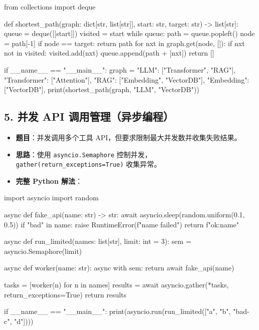 \begin{codeblock}
from collections import deque


def shortest_path(graph: dict[str, list[str]], start: str, target: str) -> list[str]:
    queue = deque([[start]])
    visited = {start}
    while queue:
        path = queue.popleft()
        node = path[-1]
        if node == target:
            return path
        for nxt in graph.get(node, []):
            if nxt not in visited:
                visited.add(nxt)
                queue.append(path + [nxt])
    return []


if __name__ == "__main__":
    graph = {
        "LLM": ["Transformer", "RAG"],
        "Transformer": ["Attention"],
        "RAG": ["Embedding", "VectorDB"],
        "Embedding": ["VectorDB"],
    }
    print(shortest_path(graph, "LLM", "VectorDB"))
\end{codeblock}

\subsection{5. 并发 API 调用管理（异步编程）}
\begin{itemize}[leftmargin=2em]
\item \textbf{题目}：并发调用多个工具 API，但要求限制最大并发数并收集失败结果。
\item \textbf{思路}：使用 \texttt{asyncio.Semaphore} 控制并发，\texttt{gather(return\_exceptions=True)} 收集异常。
\item \textbf{完整 Python 解法}：
\end{itemize}

\begin{codeblock}
import asyncio
import random


async def fake_api(name: str) -> str:
    await asyncio.sleep(random.uniform(0.1, 0.5))
    if "bad" in name:
        raise RuntimeError(f"{name} failed")
    return f"ok:{name}"


async def run_limited(names: list[str], limit: int = 3):
    sem = asyncio.Semaphore(limit)

    async def worker(name: str):
        async with sem:
            return await fake_api(name)

    tasks = [worker(n) for n in names]
    results = await asyncio.gather(*tasks, return_exceptions=True)
    return results


if __name__ == "__main__":
    print(asyncio.run(run_limited(["a", "b", "bad-c", "d"])))
\end{codeblock}


